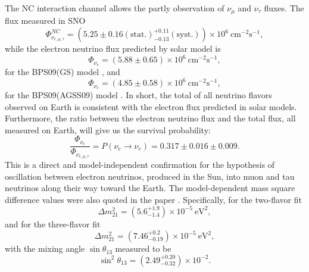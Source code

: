 The NC interaction channel allows the partly observation of $ \nu_\mu $ and $ \nu_\tau $ fluxes. The flux measured in SNO \cite{PhysRevC.88.025501}
\begin{equation}
	\Phi^{NC}_{\nu_{e, \mu, \tau}} = (5.25 \pm 0.16(\text{stat.})^{+0.11}_{-0.13}(\text{syst.})) \times 10^6~\text{cm}^{-2}\text{s}^{-1}, \nonumber
\end{equation}
while the electron neutrino flux predicted by solar model is
\begin{equation}
	\Phi_{\nu_e} = (5.88 \pm 0.65) \times 10^6~\text{cm}^{-2}\text{s}^{-1},
\end{equation}
for the BPS09(GS) model \cite{1538-4357-705-2-L123}, and
\begin{equation}
	\Phi_{\nu_e} = (4.85 \pm 0.58) \times 10^6~\text{cm}^{-2}\text{s}^{-1},
\end{equation}
for the BPS09(AGSS09) model \cite{1538-4357-705-2-L123}. In short, the total of all neutrino flavors observed on Earth is consistent with the electron flux predicted in solar models. Furthermore, the ratio between the electron neutrino flux and the total flux, all measured on Earth, will give us the survival probability:
\begin{equation}
	\dfrac{	\Phi_{\nu_e} }{	\Phi_{\nu_{e, \mu, \tau}}} = P(\nu_e\rightarrow\nu_e) = 0.317 \pm 0.016 \pm 0.009.
\end{equation}
This is a direct and model-independent  confirmation for the hypothesis of oscillation between electron neutrinos, produced in the Sun, into muon and tau neutrinos along their way toward the Earth. The model-dependent mass square difference values were also quoted in the paper \cite{PhysRevC.88.025501}. Specifically, for the two-flavor fit
\begin{equation}
	\Delta m^2_{21} = (5.6^{+1.9}_{-1.4})\times 10^{-5}~\text{eV}^2,
\end{equation}
and for the three-flavor fit
\begin{equation}
\Delta m^2_{21} = (7.46^{+0.2}_{-0.19})\times 10^{-5}~\text{eV}^2,
\end{equation}
with the mixing angle $\sin\theta_{13}$ measured to be
\begin{equation}
	\sin^2\theta_{13} = (2.49^{+0.20}_{-0.32})\times 10^{-2}.
\end{equation}

